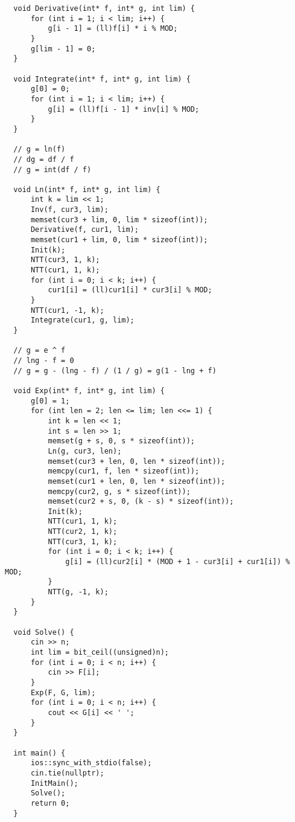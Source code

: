 \documentclass{article}
\begin{document}
\begin{multicols}{3}
\begin{lstlisting}
  void Derivative(int* f, int* g, int lim) {
      for (int i = 1; i < lim; i++) {
          g[i - 1] = (ll)f[i] * i % MOD;
      }
      g[lim - 1] = 0;
  }
  
  void Integrate(int* f, int* g, int lim) {
      g[0] = 0;
      for (int i = 1; i < lim; i++) {
          g[i] = (ll)f[i - 1] * inv[i] % MOD;
      }
  }
  
  // g = ln(f)
  // dg = df / f
  // g = int(df / f)
  
  void Ln(int* f, int* g, int lim) {
      int k = lim << 1;
      Inv(f, cur3, lim);
      memset(cur3 + lim, 0, lim * sizeof(int));
      Derivative(f, cur1, lim);
      memset(cur1 + lim, 0, lim * sizeof(int));
      Init(k);
      NTT(cur3, 1, k);
      NTT(cur1, 1, k);
      for (int i = 0; i < k; i++) {
          cur1[i] = (ll)cur1[i] * cur3[i] % MOD;
      }
      NTT(cur1, -1, k);
      Integrate(cur1, g, lim);
  }
  
  // g = e ^ f
  // lng - f = 0
  // g = g - (lng - f) / (1 / g) = g(1 - lng + f)
  
  void Exp(int* f, int* g, int lim) {
      g[0] = 1;
      for (int len = 2; len <= lim; len <<= 1) {
          int k = len << 1;
          int s = len >> 1;
          memset(g + s, 0, s * sizeof(int));
          Ln(g, cur3, len);
          memset(cur3 + len, 0, len * sizeof(int));
          memcpy(cur1, f, len * sizeof(int));
          memset(cur1 + len, 0, len * sizeof(int));
          memcpy(cur2, g, s * sizeof(int));
          memset(cur2 + s, 0, (k - s) * sizeof(int));
          Init(k);
          NTT(cur1, 1, k);
          NTT(cur2, 1, k);
          NTT(cur3, 1, k);
          for (int i = 0; i < k; i++) {
              g[i] = (ll)cur2[i] * (MOD + 1 - cur3[i] + cur1[i]) % MOD;
          }
          NTT(g, -1, k);
      }
  }
  
  void Solve() {
      cin >> n;
      int lim = bit_ceil((unsigned)n);
      for (int i = 0; i < n; i++) {
          cin >> F[i];
      }
      Exp(F, G, lim);
      for (int i = 0; i < n; i++) {
          cout << G[i] << ' ';
      }
  }
  
  int main() {
      ios::sync_with_stdio(false);
      cin.tie(nullptr);
      InitMain();
      Solve();
      return 0;
  }
\end{lstlisting}


\end{multicols}
\end{document}
